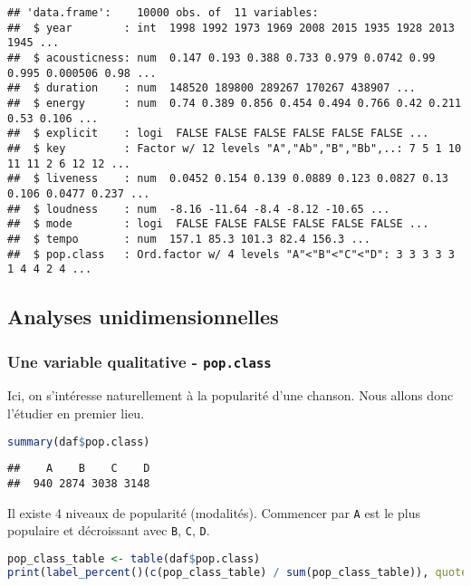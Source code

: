 \documentclass[
  11pt,
  xcolor = usenames,dvipsnames]{article}
\newcommand{\passthrough}[1]{#1}
\begin{document}
\begin{lstlisting}
## 'data.frame':    10000 obs. of  11 variables:
##  $ year        : int  1998 1992 1973 1969 2008 2015 1935 1928 2013 1945 ...
##  $ acousticness: num  0.147 0.193 0.388 0.733 0.979 0.0742 0.99 0.995 0.000506 0.98 ...
##  $ duration    : num  148520 189800 289267 170267 438907 ...
##  $ energy      : num  0.74 0.389 0.856 0.454 0.494 0.766 0.42 0.211 0.53 0.106 ...
##  $ explicit    : logi  FALSE FALSE FALSE FALSE FALSE FALSE ...
##  $ key         : Factor w/ 12 levels "A","Ab","B","Bb",..: 7 5 1 10 11 11 2 6 12 12 ...
##  $ liveness    : num  0.0452 0.154 0.139 0.0889 0.123 0.0827 0.13 0.106 0.0477 0.237 ...
##  $ loudness    : num  -8.16 -11.64 -8.4 -8.12 -10.65 ...
##  $ mode        : logi  FALSE FALSE FALSE FALSE FALSE FALSE ...
##  $ tempo       : num  157.1 85.3 101.3 82.4 156.3 ...
##  $ pop.class   : Ord.factor w/ 4 levels "A"<"B"<"C"<"D": 3 3 3 3 3 1 4 4 2 4 ...
\end{lstlisting}

\hypertarget{analyses-unidimensionnelles}{%
\subsection{Analyses unidimensionnelles}\label{analyses-unidimensionnelles}}

\hypertarget{une-variable-qualitative---pop.class}{%
\subsubsection{\texorpdfstring{Une variable qualitative - \texttt{pop.class}}{Une variable qualitative - pop.class}}\label{une-variable-qualitative---pop.class}}

Ici, on s'intéresse naturellement à la popularité d'une chanson. Nous allons donc l'étudier en premier lieu.

\begin{lstlisting}[language=R]
summary(daf$pop.class)
\end{lstlisting}

\begin{lstlisting}
##    A    B    C    D 
##  940 2874 3038 3148
\end{lstlisting}

Il existe 4 niveaux de popularité (modalités). Commencer par \passthrough{\lstinline!A!} est le plus populaire et décroissant avec \passthrough{\lstinline!B!}, \passthrough{\lstinline!C!}, \passthrough{\lstinline!D!}.

\begin{lstlisting}[language=R]
pop_class_table <- table(daf$pop.class)
print(label_percent()(c(pop_class_table) / sum(pop_class_table)), quote = F)
\end{lstlisting}
\end{document}
